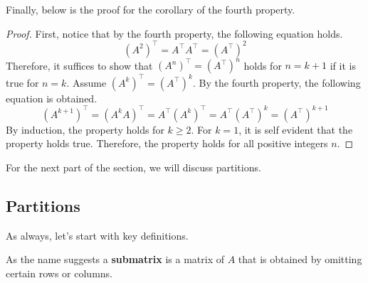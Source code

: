 \documentclass[../../../main.tex]{subfiles}
\begin{document}
Finally, below is the proof for the corollary of the fourth property.

\begin{proof}
First, notice that by the fourth property, the following equation
holds.
\[
\left( A^2 \right)^\intercal
= A^\intercal A^\intercal
= \left( A^\intercal \right)^2
\]
Therefore, it suffices to show that $(A^n)^\intercal =
(A^\intercal)^n$ holds for $n = k + 1$ if it is true for $n = k$.
Assume $(A^k)^\intercal = (A^\intercal)^k$. By the fourth property,
the following equation is obtained.
\[
\left( A^{k+1} \right)^\intercal
= (A^k A)^\intercal
= A^\intercal (A^k)^\intercal
= A^\intercal (A^\intercal)^k
= (A^\intercal)^{k + 1}
\]
By induction, the property holds for $k \geq 2$. For $k = 1$,
it is self evident that the property holds true. Therefore, the
property holds for all positive integers $n$.
\end{proof}

For the next part of the section, we will discuss partitions.

\subsection{Partitions}

As always, let's start with key definitions.

\begin{definition}{}{}
As the name suggests a \textbf{submatrix} is a matrix of $A$ that
is obtained by omitting certain rows or columns.
\end{definition}
\end{document}
